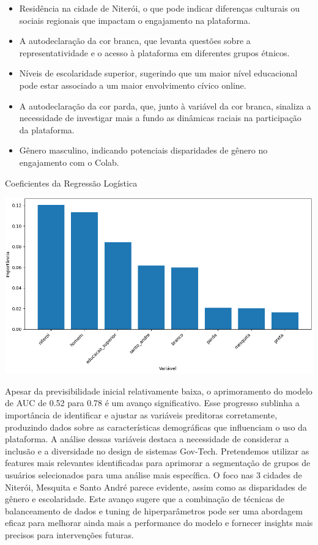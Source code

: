 \begin{itemize}
	\item Residência na cidade de Niterói, o que pode indicar diferenças culturais ou sociais regionais que impactam o engajamento na plataforma.
	\item A autodeclaração da cor branca, que levanta questões sobre a representatividade e o acesso à plataforma em diferentes grupos étnicos.
	\item Níveis de escolaridade superior, sugerindo que um maior nível educacional pode estar associado a um maior envolvimento cívico online.
	\item A autodeclaração da cor parda, que, junto à variável da cor branca, sinaliza a necessidade de investigar mais a fundo as dinâmicas raciais na participação da plataforma.
	\item Gênero masculino, indicando potenciais disparidades de gênero no engajamento com o Colab.
\end{itemize}

\begin{quadro}[!htb]
	\caption{Coeficientes da Regressão Logística}
	\label{fig:regression_chart}
	\centering
	\includegraphics[scale=0.6]{images/regression_chart.png}
\end{quadro}

Apesar da previsibilidade inicial relativamente baixa, o aprimoramento do modelo de AUC de 0.52 para 0.78 é um avanço significativo. Esse progresso sublinha a importância de identificar e ajustar as variáveis preditoras corretamente, produzindo dados sobre as características demográficas que influenciam o uso da plataforma. A análise dessas variáveis destaca a necessidade de considerar a inclusão e a diversidade no design de sistemas Gov-Tech. Pretendemos utilizar as features mais relevantes identificadas para aprimorar a segmentação de grupos de usuários selecionados para uma análise mais específica. O foco nas 3 cidades de Niterói, Mesquita e Santo André parece evidente, assim como as disparidades de gênero e escolaridade. Este avanço sugere que a combinação de técnicas de balanceamento de dados e tuning de hiperparâmetros pode ser uma abordagem eficaz para melhorar ainda mais a performance do modelo e fornecer insights mais precisos para intervenções futuras.

